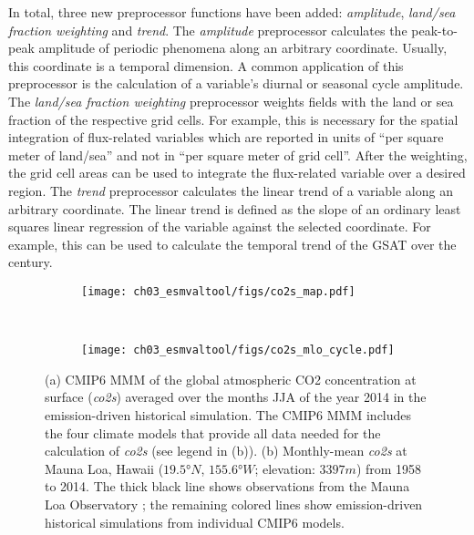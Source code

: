In total, three new preprocessor functions have been added: \emph{amplitude},
\emph{land/sea fraction weighting} and \emph{trend}. The \emph{amplitude}
preprocessor calculates the peak-to-peak amplitude of periodic phenomena along
an arbitrary coordinate. Usually, this coordinate is a temporal dimension. A
common application of this preprocessor is the calculation of a variable's
diurnal or seasonal cycle amplitude. The \emph{land/sea fraction weighting}
preprocessor weights fields with the land or sea fraction of the respective
grid cells. For example, this is necessary for the spatial integration of
flux-related variables which are reported in units of \enquote{per square meter
  of land/sea} and not in \enquote{per square meter of grid cell}. After the
weighting, the grid cell areas can be used to integrate the flux-related
variable over a desired region. The \emph{trend} preprocessor calculates the
linear trend of a variable along an arbitrary coordinate. The linear trend is
defined as the slope of an ordinary least squares linear regression of the
variable against the selected coordinate. For example, this can be used to
calculate the temporal trend of the \ac{GSAT} over the  century.

\begin{figure}[t]
  \centering
  \begin{subfigure}[t]{\SubfigureWidth{}}
    \texttt{[image: ch03\_esmvaltool/figs/co2s\_map.pdf]}
    \caption{}
    \label{fig:03:co2s:a}
  \end{subfigure}
  ~
  \begin{subfigure}[t]{\SubfigureWidth{}}
    \texttt{[image: 
      ch03\_esmvaltool/figs/co2s\_mlo\_cycle.pdf]}
    \caption{}
    \label{fig:03:co2s:b}
  \end{subfigure}
  \caption{(a) \acs{CMIP}6 \acf{MMM} of the global atmospheric \acs{CO2}
    concentration at surface (\emph{co2s}) averaged over the months \acf{JJA}
    of the year 2014 in the emission-driven historical simulation. The
    \acs{CMIP}6 \acs{MMM} includes the four climate models that provide all
    data needed for the calculation of \emph{co2s} (see legend in (b)). (b)
    Monthly-mean \emph{co2s} at Mauna Loa, Hawaii ($19.5 \unit{\degree N}$,
    $155.6 \unit{\degree W}$; elevation: $3397 \unit{m}$) from 1958 to 2014.
    The thick black line shows observations from the Mauna Loa Observatory
    \autocite{Keeling2005}; the remaining colored lines show emission-driven
    historical simulations from individual \acs{CMIP}6 models.}
  \label{fig:03:co2s}
\end{figure}

